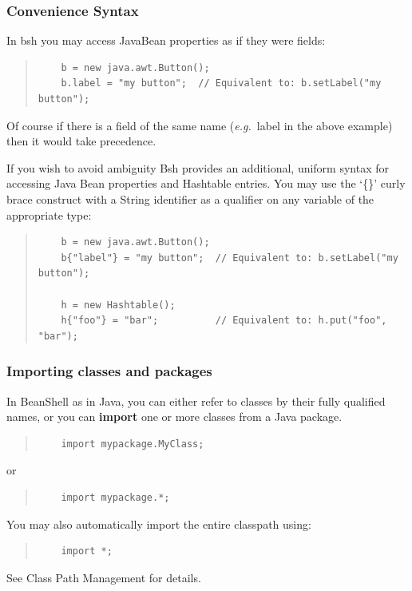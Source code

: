 \documentclass[twoside,11pt]{article}
\renewcommand{\_}{\texttt{\symbol{95}}}
\newcommand{\eg}{\textit{e.g.}}
\begin{document}
\subsubsection{Convenience Syntax}
In bsh you may access JavaBean properties as if they were fields:
\begin{quote}
\begin{verbatim}
    b = new java.awt.Button();
    b.label = "my button";  // Equivalent to: b.setLabel("my button");
\end{verbatim}
\end{quote}

Of course if there is a field of the same name (\eg\ label in the above
example) then it would take precedence.

If you wish to avoid ambiguity Bsh provides an additional, uniform
syntax for accessing Java Bean properties and Hashtable entries.  You
may use the `\{\}' curly brace construct with a String identifier as a
qualifier on any variable of the appropriate type:
\begin{quote}
\begin{verbatim}
    b = new java.awt.Button();
    b{"label"} = "my button";  // Equivalent to: b.setLabel("my button");

    h = new Hashtable();
    h{"foo"} = "bar";          // Equivalent to: h.put("foo", "bar");
\end{verbatim}
\end{quote}

\subsubsection{Importing classes and packages}

In BeanShell as in Java, you can either refer to classes by their fully
qualified names, or you can \textbf{import} one or more classes
from a Java package.
\begin{quote}
\begin{verbatim}
    import mypackage.MyClass;
\end{verbatim}
\end{quote}
or
\begin{quote}
\begin{verbatim}
    import mypackage.*;
\end{verbatim}
\end{quote}
You may also automatically import the entire classpath using:
\begin{quote}
\begin{verbatim}
    import *;
\end{verbatim}
\end{quote}
See Class Path Management for details.
\end{document}
